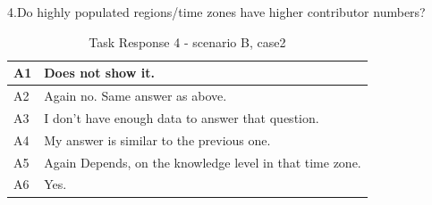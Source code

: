 \documentclass[double,12pt]{beavtex}
\begin{document}
\begin{appendices}
4.Do highly populated regions/time zones have higher contributor numbers?

\begin{table}[H]
\begin{tabular}{ |p{2cm}|p{12cm}| }
 \hline
 A1 & Does not show it.\\
 \hline
 A2 & Again no. Same answer as above.
\\ \hline
 A3 & I don't have enough data to answer that question.\\ \hline
 A4 & My answer is similar to the previous one.\\ \hline
 A5 & Again Depends, on the knowledge level in that time zone.\\ \hline
 A6 & Yes.\\
 \hline
\end{tabular}
\caption{Task Response 4 - scenario B, case2}
\label{tab:table34}
\end{table}

\end{appendices}
\end{document}
